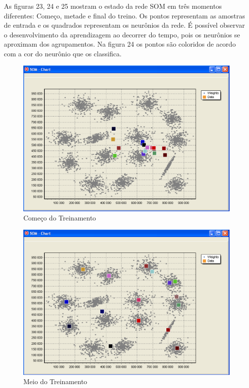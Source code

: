 As figuras 23, 24 e 25 mostram o estado da rede SOM em três momentos diferentes: Começo, metade e final do treino. Os pontos representam as amostras de entrada e os quadrados representam os neurônios da rede. É possível observar o desenvolvimento da aprendizagem ao decorrer do tempo, pois os neurônios se aproximam dos agrupamentos. Na figura 24 os pontos são coloridos de acordo com a cor do neurônio que os classifica.

\begin{figure}[!h]
\centering
\includegraphics[keepaspectratio=true,scale=0.5]
{figuras/som1.eps}
\caption{Começo do Treinamento}
\label{data_titatic}
\end{figure} 


\begin{figure}[!h]
\centering
\includegraphics[keepaspectratio=true,scale=0.5]
{figuras/som2.eps}
\caption{Meio do Treinamento}
\label{data_titatic}
\end{figure} 



